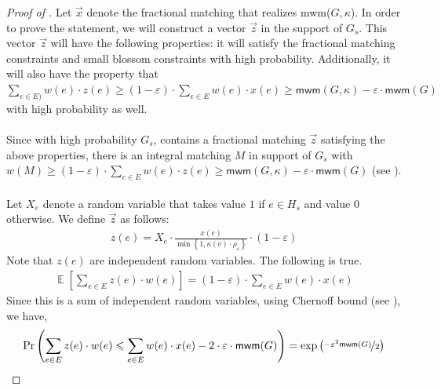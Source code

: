 \documentclass[a4paper,11pt]{article}
\DeclareMathOperator*{\Exp}{\ensuremath{{\mathbb{E}}}}
\DeclareMathOperator*{\Prob}{\ensuremath{\textnormal{Pr}}}
\renewcommand{\Pr}{\Prob}
\newcommand{\prob}[1]{\Pr\paren{#1}}
\newcommand{\paren}[1]{\left ( #1 \right )}
\newcommand{\bracket}[1]{\left [ #1 \right ]}
\newcommand{\expect}[1]{\Exp\bracket{#1}}
\newcommand{\var}[1]{\textnormal{Var}\bracket{#1}}
\newcommand{\set}[1]{\ensuremath{\left\{ #1 \right\}}}
\newcommand{\eps}{\varepsilon}
\theoremstyle{definition}
\theoremstyle{definition}
\theoremstyle{definition}
\theoremstyle{definition}
\theoremstyle{definition}
\newtheorem{lemma2}[definition2]{Lemma}
\theoremstyle{definition}
\theoremstyle{definition}
\theoremstyle{definition}
\theoremstyle{definition}
\theoremstyle{definition}
\theoremstyle{definition}
\theoremstyle{definition}
\theoremstyle{definition}
\theoremstyle{definition}
\theoremstyle{definition}
\begin{document}
 

\begin{proof}[Proof of ]
Let $\vec{x}$ denote the fractional matching that realizes \textsf{mwm}($G,\kappa$). In order to prove the statement, we will construct a vector $\vec{z}$ in the support of $G_s$. This vector $\vec{z}$ will have the following properties: it will satisfy the fractional matching constraints and small blossom constraints with high probability. Additionally, it will also have the property that $\sum_{e\in E)}w(e)\cdot z(e)\geqslant (1-\eps)\cdot \sum_{e\in E}w(e)\cdot x(e)\geqslant \textsf{mwm}(G,\kappa)-\eps\cdot \textsf{mwm}(G)$ with high probability as well.\\ \\
Since with high probability $G_s$, contains a fractional matching $\vec{z}$ satisfying the above properties, there is an integral matching $M$ in support of $G_s$ with $w(M)\geqslant (1-\eps)\cdot \sum_{e\in E}w(e)\cdot z(e)\geqslant \textsf{mwm}(G,\kappa)-\eps\cdot \textsf{mwm}(G)$ (see ). \\ \\
Let $X_e$ denote a random variable that takes value $1$ if $e\in H_s$ and value $0$ otherwise. We define $\vec{z}$ as follows:
\begin{align*}
z(e)=X_e\cdot \frac{x(e)}{\min\set{1,\kappa(e)\cdot \rho_{\eps}}}\cdot (1-\eps)
\end{align*}
Note that $z(e)$ are independent random variables. The following is true.
\begin{align*}
\expect{\sum_{e\in E}z(e)\cdot w(e)}=(1-\eps)\cdot \sum_{e\in E} w(e)\cdot x(e)
\end{align*}
Since this is a sum of independent random variables, using Chernoff bound (see ), we have,
\begin{align*}
\prob{\sum_{e\in E}z(e)\cdot w(e)\leqslant \sum_{e\in E} w(e)\cdot x(e)-2\cdot\eps\cdot \textsf{mwm}(G)}=\exp\paren{\nicefrac{-\eps^2\textsf{mwm}(G)}{2}}

\end{align*}
\end{proof}
\end{document}
